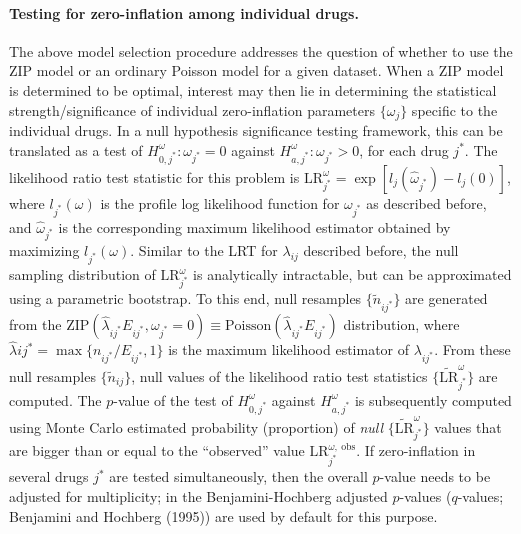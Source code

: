 \hypertarget{testing-for-zero-inflation-among-individual-drugs.}{%
\paragraph{Testing for zero-inflation among individual drugs.}\label{testing-for-zero-inflation-among-individual-drugs.}}

The above model selection procedure addresses the question of whether to use the ZIP model or an ordinary Poisson model for a given dataset. When a ZIP model is determined to be optimal, interest may then lie in determining the statistical strength/significance of individual zero-inflation parameters \(\{\omega_{j}\}\) specific to the individual drugs. In a null hypothesis significance testing framework, this can be translated as a test of \(H_{0, j^*}^\omega: \omega_{j^*} = 0\) against \(H_{a, j^*}^\omega : \omega_{j^*} > 0\), for each drug \(j^*\). The likelihood ratio test statistic for this problem is \(\text{LR}_{j^*}^\omega = \exp \left[l_j(\hat \omega_{j^*}) - l_j(0) \right]\), where \(l_{j^*}(\omega)\) is the profile log likelihood function for \(\omega_{j^*}\) as described before, and \(\hat \omega_{j^*}\) is the corresponding maximum likelihood estimator obtained by maximizing \(l_{j^*}(\omega)\). Similar to the LRT for \(\lambda_{ij}\) described before, the null sampling distribution of \(\text{LR}_{j^*}^\omega\) is analytically intractable, but can be approximated using a parametric bootstrap. To this end, null resamples \(\{\tilde n_{ij^*}\}\) are generated from the \(\text{ZIP}(\hat \lambda_{i j^*} E_{i j^*}, \omega_{j^*} = 0) \equiv \text{Poisson}(\hat \lambda_{i j^*} E_{i j^*})\) distribution, where \(\hat \lambda{i j^*} = \max\{n_{ij^*}/E_{ij^*}, 1\}\) is the maximum likelihood estimator of \(\lambda_{ij^*}\). From these null resamples \(\{\tilde{n}_{i j}\}\), null values of the likelihood ratio test statistics \(\{\widetilde{\text{LR}}_{j^*}^\omega\}\) are computed. The \(p\)-value of the test of \(H_{0, j^*}^\omega\) against \(H_{a, j^*}^\omega\) is subsequently computed using Monte Carlo estimated probability (proportion) of \emph{null} \(\{\widetilde{\text{LR}}_{j^*}^\omega\}\) values that are bigger than or equal to the ``observed'' value \(\text{LR}_{j^*}^{\omega,\ \text{obs}}\). If zero-inflation in several drugs \({j^*}\) are tested simultaneously, then the overall \(p\)-value needs to be adjusted for multiplicity; in  the Benjamini-Hochberg adjusted \(p\)-values (\(q\)-values; Benjamini and Hochberg (1995)) are used by default for this purpose.

